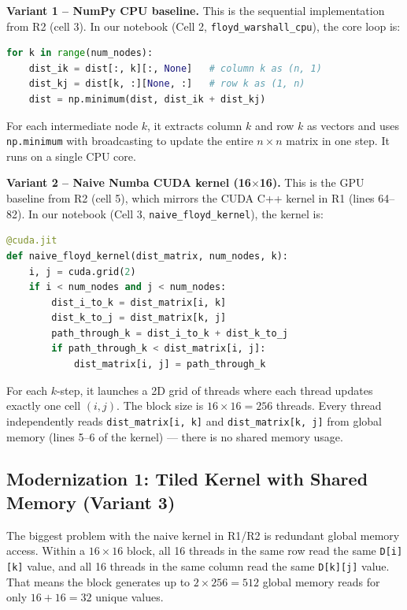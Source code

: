 \documentclass[11pt]{article}
\begin{document}
\textbf{Variant 1 -- NumPy CPU baseline.} This is the sequential implementation from R2 (cell 3). In our notebook (Cell 2, \texttt{floyd\_warshall\_cpu}), the core loop is:

\begin{lstlisting}[language=Python]
for k in range(num_nodes):
    dist_ik = dist[:, k][:, None]   # column k as (n, 1)
    dist_kj = dist[k, :][None, :]   # row k as (1, n)
    dist = np.minimum(dist, dist_ik + dist_kj)
\end{lstlisting}

For each intermediate node $k$, it extracts column $k$ and row $k$ as vectors and uses \texttt{np.minimum} with broadcasting to update the entire $n \times n$ matrix in one step. It runs on a single CPU core.

\textbf{Variant 2 -- Naive Numba CUDA kernel (16$\times$16).} This is the GPU baseline from R2 (cell 5), which mirrors the CUDA C++ kernel in R1 (lines 64--82). In our notebook (Cell 3, \texttt{naive\_floyd\_kernel}), the kernel is:

\begin{lstlisting}[language=Python]
@cuda.jit
def naive_floyd_kernel(dist_matrix, num_nodes, k):
    i, j = cuda.grid(2)
    if i < num_nodes and j < num_nodes:
        dist_i_to_k = dist_matrix[i, k]
        dist_k_to_j = dist_matrix[k, j]
        path_through_k = dist_i_to_k + dist_k_to_j
        if path_through_k < dist_matrix[i, j]:
            dist_matrix[i, j] = path_through_k
\end{lstlisting}

For each $k$-step, it launches a 2D grid of threads where each thread updates exactly one cell $(i, j)$. The block size is $16 \times 16 = 256$ threads. Every thread independently reads \texttt{dist\_matrix[i, k]} and \texttt{dist\_matrix[k, j]} from global memory (lines 5--6 of the kernel) --- there is no shared memory usage.

\subsection{Modernization 1: Tiled Kernel with Shared Memory (Variant 3)}

The biggest problem with the naive kernel in R1/R2 is redundant global memory access. Within a $16 \times 16$ block, all 16 threads in the same row read the same \texttt{D[i][k]} value, and all 16 threads in the same column read the same \texttt{D[k][j]} value. That means the block generates up to $2 \times 256 = 512$ global memory reads for only $16 + 16 = 32$ unique values.
\end{document}
